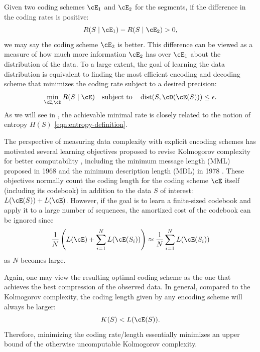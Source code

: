 \documentclass[../../book-main.tex]{subfiles}
\begin{document}
Given two coding schemes \(\cE_{1}\) and \(\cE_{2}\) for the
segments, if the difference in the coding rates is positive:
\begin{equation}
    R(S \mid \cE_{1}) -  R(S \mid \cE_{2}) > 0,
\end{equation}
we may say the coding scheme \(\cE_{2}\) is better. This difference
can be viewed as a measure of how much more information \(\cE_{2}\)
has over \(\cE_{1}\) about the distribution of the data. To a large
extent, the goal of learning the data distribution is equivalent to
finding the most efficient encoding and decoding scheme that
minimizes the coding rate subject to a desired precision:
\begin{equation}
    \min_{\cE, \cD} R(S \mid \cE) \quad \text{subject to} \quad
    \operatorname{dist}(S, \cD(\cE(S))) \leq \epsilon.
\end{equation}
As we will see in , the achievable minimal rate is
closely related to the notion of entropy \(H(S)\)
\eqref{eqn:entropy-definition}.

\begin{remark}\label{rem:computable-complexity}
    The perspective of measuring data complexity with explicit
    encoding schemes has motivated several learning objectives
    proposed to revise Kolmogorov complexity for better computability
    \cite{WallaceC1999}, including the minimum message length (MML)
    proposed in 1968 \cite{WallaceC1968} and the minimum description
    length (MDL) in 1978 \cite{Rissanen-1978,HansenM2001}. These
    objectives normally count the coding length for the coding scheme
    \(\cE\) itself (including its codebook) in addition to the data
    \(S\) of interest: \(L(\cE(S)) + L(\cE)\). However, if the goal
    is to learn a finite-sized codebook and apply it to a large
    number of sequences, the amortized cost of the codebook can be ignored since
    \begin{equation}
        \frac{1}{N}\left( L(\cE) + \sum_{i=1}^{N}
        L(\cE(S_{i}))\right) \approx \frac{1}{N}\sum_{i=1}^{N} L(\cE(S_{i}))
    \end{equation}
    as \(N\) becomes large.
\end{remark}

Again, one may view the resulting optimal coding scheme as the one
that achieves the best compression of the observed data. In general,
compared to the Kolmogorov complexity, the coding length given by any
encoding scheme will always be larger:
\begin{equation}
    K(S) < L(\cE(S)).
\end{equation}
Therefore, minimizing the coding rate/length essentially minimizes an
upper bound of the otherwise uncomputable Kolmogorov complexity.
\end{document}
